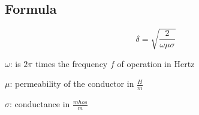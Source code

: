 \documentclass[a4paper, 10pt]{scrartcl}
\begin{document}
\tableofcontents
\newpage

\subsection{Formula}

\begin{displaymath}
\delta = \sqrt{\frac{2}{\omega\mu\sigma}}
\end{displaymath}

$\omega$: is $2\pi$ times the frequency $f$ of operation in Hertz

$\mu$: permeability of the conductor in $\frac{H}{m}$

$\sigma$: conductance in $\frac{mhos}{m}$
\end{document}
